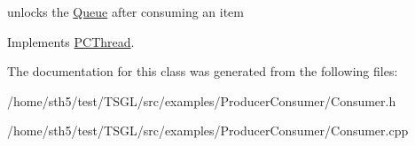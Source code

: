 unlocks the \hyperlink{class_queue}{Queue} after consuming an item 

Implements \hyperlink{class_p_c_thread}{P\+C\+Thread}.



The documentation for this class was generated from the following files\+:\begin{DoxyCompactItemize}
\item 
/home/sth5/test/\+T\+S\+G\+L/src/examples/\+Producer\+Consumer/Consumer.\+h\item 
/home/sth5/test/\+T\+S\+G\+L/src/examples/\+Producer\+Consumer/Consumer.\+cpp\end{DoxyCompactItemize}
